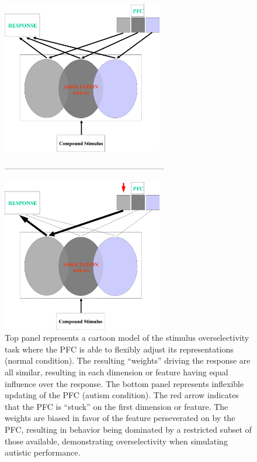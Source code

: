 \begin{figure}
\begin{center}
	\includegraphics[width=70mm]{figures/so_model_no_persev_new_2.eps}

-----------------------------------------------------------

	\includegraphics[width=70mm]{figures/so_model_d1_persev_new_2.eps}
\end{center}
\caption{Top panel represents a cartoon model of the stimulus overselectivity task where the PFC is able to flexibly adjust its representations (normal condition).  The resulting ``weights'' driving the response are all similar, resulting in each dimension or feature having equal influence over the response.  The bottom panel represents inflexible updating of the PFC (autism condition).  The red arrow indicates that the PFC is ``stuck'' on the first dimension or feature.  The weights are biased in favor of the feature perseverated on by the PFC, resulting in behavior being dominated by a restricted subset of those available, demonstrating overselectivity when simulating autistic performance.}
\label{OS-Model-Cartoon}
\end{figure} 


